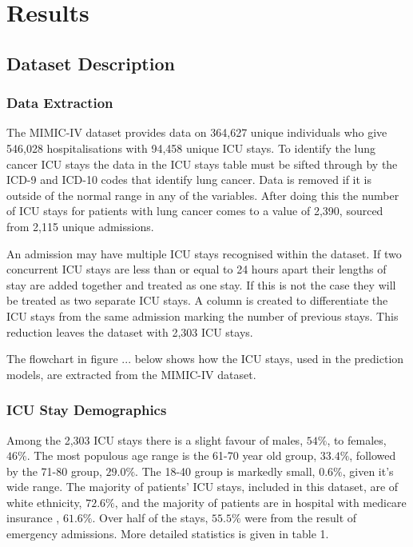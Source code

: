 \documentclass[11pt]{article}
\begin{document}

\newpage

\section{Results}

\subsection{Dataset Description}

\subsubsection{Data Extraction}

The MIMIC-IV dataset provides data on 364,627 unique individuals who give 546,028 hospitalisations with 94,458 unique ICU stays. To identify the lung cancer ICU stays the data in the ICU stays table must be sifted through by the ICD-9 and ICD-10 codes that identify lung cancer. Data is removed if it is outside of the normal range in any of the variables. After doing this the number of ICU stays for patients with lung cancer comes to a value of 2,390, sourced from 2,115 unique admissions.

An admission may have multiple ICU stays recognised within the dataset. If two concurrent ICU stays are less than or equal to 24 hours apart their lengths of stay are added together and treated as one stay. If this is not the case they will be treated as two separate ICU stays. A column is created to differentiate the ICU stays from the same admission marking the number of previous stays. This reduction leaves the dataset with 2,303 ICU stays.

The flowchart in figure ... below shows how the ICU stays, used in the prediction models, are extracted from the MIMIC-IV dataset.

\subsubsection{ICU Stay Demographics}

Among the 2,303 ICU stays there is a slight favour of males, \(54\%\), to females, \(46\%\).  The most populous age range is the 61-70  year old group, \(33.4\%\), followed by the 71-80 group, \(29.0\%\). The 18-40 group is markedly small, \(0.6\%\),  given it's wide range. The majority of patients' ICU stays, included in this dataset, are of white ethnicity, \(72.6\%\), and the majority of patients are in hospital with medicare insurance , \(61.6\%\). Over half of the stays, \(55.5\%\) were from the result of emergency admissions. More detailed statistics is given in table 1.
\end{document}
